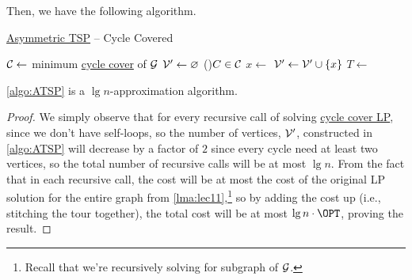 Then, we have the following algorithm.

\begin{algorithm}[H]\label{algo:ATSP}
	\DontPrintSemicolon
	\caption{\hyperref[prb:ATSP]{Asymmetric TSP} -- Cycle Covered}
	\BlankLine
	\(\mathcal{\MakeUppercase{C}}\gets\) minimum \hyperref[subsec:cycle-covering-LP]{cycle cover} of \(\mathcal{\MakeUppercase{g}}\)\;
	\(\mathcal{\MakeUppercase{v}} ^\prime \gets \varnothing \)\;
	\For(){\(C\in \mathcal{\MakeUppercase{C}} \)}{
		\(x\gets\)
		\(\mathcal{\MakeUppercase{v}} ^\prime \gets \mathcal{\MakeUppercase{v}} ^\prime \cup \left\{ x \right\}\)\;
	}
	\(T\gets\)
	\;
	\;
\end{algorithm}

\begin{theorem}
	\autoref{algo:ATSP} is a \(\lg n\)-approximation algorithm.
\end{theorem}
\begin{proof}
	We simply observe that for every recursive call of solving \hyperref[subsec:cycle-covering-LP]{cycle cover LP}, since we don't have self-loops, so the number of vertices, \(\mathcal{\MakeUppercase{v}} ^\prime \), constructed in \autoref{algo:ATSP} will decrease by a factor of \(2\) since every cycle need at least two vertices, so the total number of recursive calls will be at most \(\lg n\). From the fact that in each recursive call, the cost will be at most the cost of the original LP solution for the entire graph from \autoref{lma:lec11},\footnote{Recall that we're recursively solving for subgraph of \(\mathcal{\MakeUppercase{g}} \).} so by adding the cost up (i.e., stitching the tour together), the total cost will be at most \(\lg n\cdot \OPT\), proving the result.
\end{proof}


